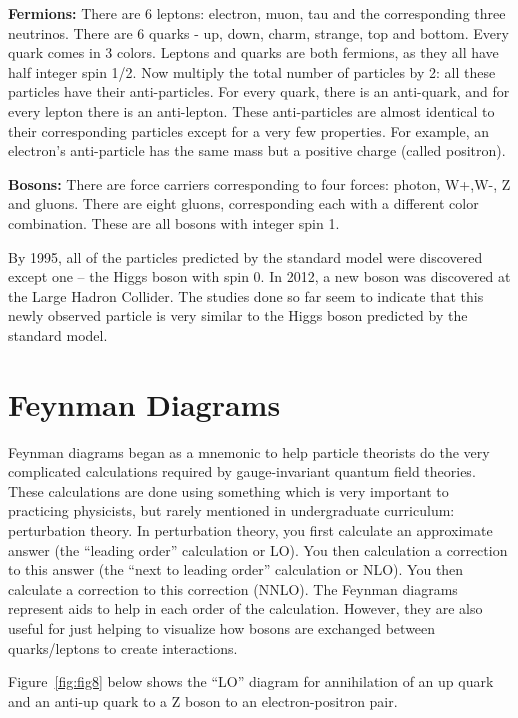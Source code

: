 {\bf Fermions:} There are 6 leptons: electron, muon, tau and the corresponding three neutrinos.
There are 6 quarks - up, down, charm, strange, top and bottom. Every quark comes in 3 colors.
Leptons and quarks are both fermions, as they all have half integer spin 1/2.
Now multiply the total number of particles by 2: all these particles have their anti-particles. For every quark, there is an anti-quark, and for every lepton there is an anti-lepton. These anti-particles are almost identical to their corresponding particles except for a very few properties.  For example, an electron's anti-particle has the same mass but a positive charge (called positron).

{\bf Bosons:} There are force carriers corresponding to four forces: photon, W+,W-,  Z and gluons.  There are eight gluons, corresponding each with a different color combination.  These are all bosons with integer spin 1.

By 1995, all of the particles predicted by the standard model were discovered except one – the Higgs boson with spin 0. In 2012, a new boson was discovered at the Large Hadron Collider.  The studies done so far seem to indicate that this newly observed particle is very similar to the Higgs boson predicted by the standard model. 


\section{Feynman Diagrams}

Feynman diagrams began as a mnemonic to help particle theorists do the very complicated calculations required by gauge-invariant quantum field theories.  These calculations are done using something which is very important to practicing physicists, but rarely mentioned in undergraduate curriculum: perturbation theory.  In perturbation theory, you first calculate an approximate answer (the “leading order” calculation or LO).  You then calculation a correction to this answer (the “next to leading order” calculation or NLO).  You then calculate a correction to this correction (NNLO).  The Feynman diagrams represent aids to help in each order of the calculation.  However, they are also useful for just helping to visualize how bosons are exchanged between quarks/leptons to create interactions.

Figure~\ref{fig:fig8} below shows the “LO” diagram for annihilation of an up quark and an anti-up quark to a Z boson to an electron-positron pair.


